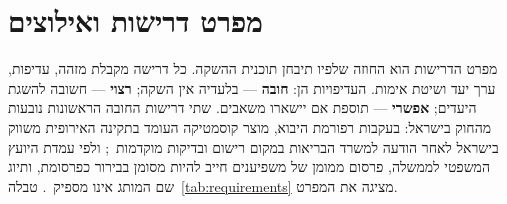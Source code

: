 \section{מפרט דרישות ואילוצים}
\label{sec:problem-reqs}

מפרט הדרישות הוא החוזה שלפיו תיבחן תוכנית ההשקה. כל דרישה מקבלת מזהה, עדיפות,
ערך יעד ושיטת אימות. העדיפויות הן: \textbf{חובה} --- בלעדיה אין השקה;
\textbf{רצוי} --- חשובה להשגת היעדים; \textbf{אפשרי} --- תוספת אם יישארו משאבים.
שתי דרישות החובה הראשונות נובעות מהחוק בישראל: בעקבות רפורמת היבוא, מוצר
קוסמטיקה העומד בתקינה האירופית משווק בישראל לאחר הודעה למשרד הבריאות במקום
רישום ובדיקות מוקדמות~\cite{ita2023israelcosmetics}; ולפי עמדת היועץ המשפטי
לממשלה, פרסום ממומן של משפיענים חייב להיות מסומן בבירור כפרסומת, ותיוג שם המותג
אינו מספיק~\cite{ravia2021influencers}. טבלה~\ref{tab:requirements} מציגה את
המפרט.

